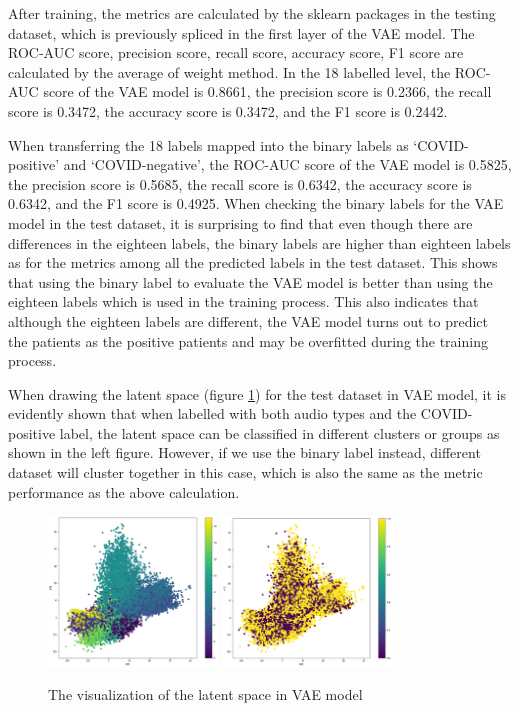 \documentclass[11pt]{article}
\begin{document}
After training, the metrics are calculated by the sklearn packages in the testing dataset, which is previously spliced in the first layer of the VAE model. The ROC-AUC score, precision score, recall score, accuracy score, F1 score are calculated by the average of weight method. In the 18 labelled level, the ROC-AUC score of the VAE model is 0.8661, the precision score is 0.2366, the recall score is 0.3472, the accuracy score is 0.3472, and the F1 score is 0.2442.
 
When transferring the 18 labels mapped into the binary labels as ‘COVID-positive’ and ‘COVID-negative’, the ROC-AUC score of the VAE model is 0.5825, the precision score is 0.5685, the recall score is 0.6342, the accuracy score is 0.6342, and the F1 score is 0.4925. When checking the binary labels for the VAE model in the test dataset, it is surprising to find that even though there are differences in the eighteen labels, the binary labels are higher than eighteen labels as for the metrics among all the predicted labels in the test dataset. This shows that using the binary label to evaluate the VAE model is better than using the eighteen labels which is used in the training process. This also indicates that although the eighteen labels are different, the VAE model turns out to predict the patients as the positive patients and may be overfitted during the training process.

When drawing the latent space (figure \ref{fig:latent_space}) for the test dataset in VAE model, it is evidently shown that when labelled with both audio types and the COVID-positive label, the latent space can be classified in different clusters or groups as shown in the left figure. However, if we use the binary label instead, different dataset will cluster together in this case, which is also the same as the metric performance as the above calculation.

\begin{figure}[htbp]{}
	\centering
    \includegraphics[width=0.4\textwidth]{./imgs/latentSpace1.png} %
    \includegraphics[width=0.4\textwidth]{./imgs/latentSpace2.png} %
    \caption{The visualization of the latent space in VAE model}
    \label{fig:latent_space}
\end{figure}
\end{document}
